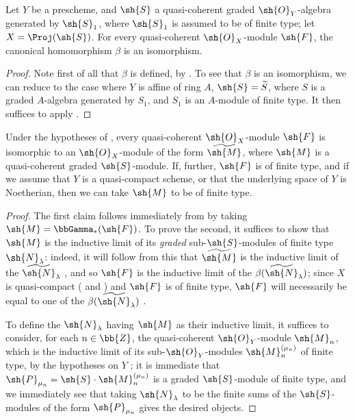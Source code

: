 \begin{theorem}[3.4.4]
\label{II.3.4.4}
Let $Y$ be a prescheme, and $\sh{S}$ a quasi-coherent graded $\sh{O}_Y$-algebra generated by $\sh{S}_1$, where $\sh{S}_1$ is assumed to be of finite type;
let $X=\Proj(\sh{S})$.
For every quasi-coherent $\sh{O}_X$-module $\sh{F}$, the canonical homomorphism $\beta$  is an isomorphism.
\end{theorem}

\begin{proof}
Note first of all that $\beta$ is defined, by .
To see that $\beta$ is an isomorphism, we can reduce to the case where $Y$ is affine of ring $A$, $\sh{S}=\widetilde{S}$, where $S$ is a graded $A$-algebra generated by $S_1$, and $S_1$ is an $A$-module of finite type.
It then suffices to apply .
\end{proof}

\begin{corollary}[3.4.5]
\label{II.3.4.5}
Under the hypotheses of , every quasi-coherent $\sh{O}_X$-module $\sh{F}$ is isomorphic to an $\sh{O}_X$-module of the form $\widetilde{\sh{M}}$, where $\sh{M}$ is a quasi-coherent graded $\sh{S}$-module.
If, further, $\sh{F}$ is of finite type, and if we assume that $Y$ is a quasi-compact scheme, or that the underlying space of $Y$ is Noetherian, then we can take $\sh{M}$ to be of finite type.
\end{corollary}

\begin{proof}
The first claim follows immediately from  by taking $\sh{M}=\bbGamma_*(\sh{F})$.
To prove the second, it suffices to show that $\sh{M}$ is the inductive limit of its \emph{graded} sub-$\sh{S}$-modules of finite type $\sh{N}_\lambda$: indeed, it will follow from this that $\widetilde{\sh{M}}$ is the inductive limit of the $\widetilde{\sh{N}}_\lambda$ , and so $\sh{F}$ is the inductive limit of the $\beta(\widetilde{\sh{N}}_\lambda)$;
since $X$ is quasi-compact ( and ) and $\sh{F}$ is of finite type, $\sh{F}$ will necessarily be equal to one of the $\beta(\widetilde{\sh{N}}_\lambda)$ .

To define the $\sh{N}_\lambda$ having $\sh{M}$ as their inductive limit, it suffices to consider, for each $n\in\bb{Z}$, the quasi-coherent $\sh{O}_Y$-module $\sh{M}_n$, which is the inductive limit of its sub-$\sh{O}_Y$-modules $\sh{M}_n^{(\mu_n)}$ of finite type, by the hypotheses on $Y$ ;
it is immediate that $\sh{P}_{\mu_n}=\sh{S}\cdot\sh{M}_n^{(\mu_n)}$ is a graded $\sh{S}$-module of finite type, and we immediately see that taking $\sh{N}_\lambda$ to be the finite sums of the $\sh{S}$-modules of the form $\sh{P}_{\mu_n}$ gives the desired objects.
\end{proof}


